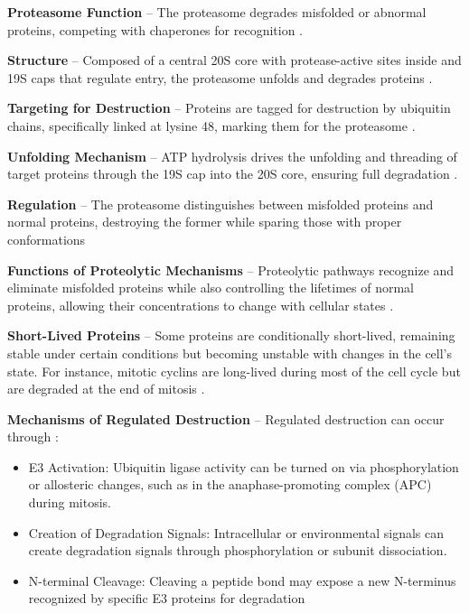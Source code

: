 
\textbf{Proteasome Function} – The proteasome degrades misfolded or abnormal proteins, competing with chaperones for recognition \cite*{L1-Chapter6}.

\textbf{Structure} – Composed of a central 20S core with protease-active sites inside and 19S caps that regulate entry, the proteasome unfolds and degrades proteins \cite*{L1-Chapter6}.

\textbf{Targeting for Destruction} – Proteins are tagged for destruction by ubiquitin chains, specifically linked at lysine 48, marking them for the proteasome \cite*{L1-Chapter6}.

\textbf{Unfolding Mechanism} – ATP hydrolysis drives the unfolding and threading of target proteins through the 19S cap into the 20S core, ensuring full degradation \cite*{L1-Chapter6}.

\textbf{Regulation} – The proteasome distinguishes between misfolded proteins and normal proteins, destroying the former while sparing those with proper conformations \cite*{L1-Chapter6}



\textbf{Functions of Proteolytic Mechanisms} – Proteolytic pathways recognize and eliminate misfolded proteins while also controlling the lifetimes of normal proteins, allowing their concentrations to change with cellular states \cite*{L1-Chapter6}.

\textbf{Short-Lived Proteins} – Some proteins are conditionally short-lived, remaining stable under certain conditions but becoming unstable with changes in the cell's state. For instance, mitotic cyclins are long-lived during most of the cell cycle but are degraded at the end of mitosis \cite*{L1-Chapter6}.

\textbf{Mechanisms of Regulated Destruction} – Regulated destruction can occur through \cite*{L1-Chapter6}:
\begin{highlight}
    \begin{itemize}
        \item E3 Activation: Ubiquitin ligase activity can be turned on via phosphorylation or allosteric changes, such as in the anaphase-promoting complex (APC) during mitosis.
        \item Creation of Degradation Signals: Intracellular or environmental signals can create degradation signals through phosphorylation or subunit dissociation.
        \item N-terminal Cleavage: Cleaving a peptide bond may expose a new N-terminus recognized by specific E3 proteins for degradation
    \end{itemize}
\end{highlight}

